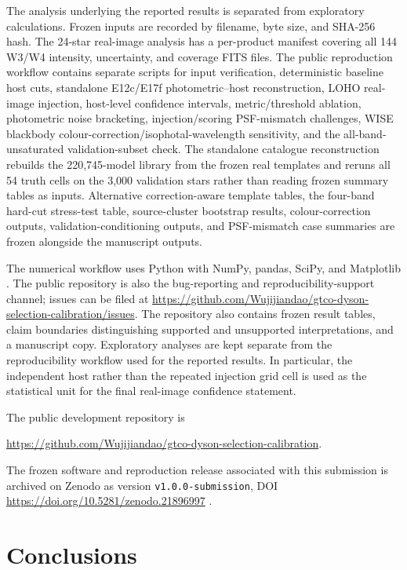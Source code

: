 \documentclass[fleqn,usenatbib]{mnras}
\begin{document}
The analysis underlying the reported results is separated from exploratory calculations. Frozen inputs are recorded by filename, byte size, and SHA-256 hash. The 24-star real-image analysis has a per-product manifest covering all 144 W3/W4 intensity, uncertainty, and coverage FITS files. The public reproduction workflow contains separate scripts for input verification, deterministic baseline host cuts, standalone E12c/E17f photometric--host reconstruction, LOHO real-image injection, host-level confidence intervals, metric/threshold ablation, photometric noise bracketing, injection/scoring PSF-mismatch challenges, WISE blackbody colour-correction/isophotal-wavelength sensitivity, and the all-band-unsaturated validation-subset check. The standalone catalogue reconstruction rebuilds the 220,745-model library from the frozen real templates and reruns all 54 truth cells on the 3,000 validation stars rather than reading frozen summary tables as inputs. Alternative correction-aware template tables, the four-band hard-cut stress-test table, source-cluster bootstrap results, colour-correction outputs, validation-conditioning outputs, and PSF-mismatch case summaries are frozen alongside the manuscript outputs.

The numerical workflow uses Python with NumPy, pandas, SciPy, and Matplotlib \citep{Harris2020,McKinney2010,Virtanen2020,Hunter2007}. The public repository is also the bug-reporting and reproducibility-support channel; issues can be filed at \url{https://github.com/Wujijiandao/gtco-dyson-selection-calibration/issues}. The repository also contains frozen result tables, claim boundaries distinguishing supported and unsupported interpretations, and a manuscript copy. Exploratory analyses are kept separate from the reproducibility workflow used for the reported results. In particular, the independent host rather than the repeated injection grid cell is used as the statistical unit for the final real-image confidence statement.

The public development repository is
\begin{center}
\url{https://github.com/Wujijiandao/gtco-dyson-selection-calibration}.
\end{center}
The frozen software and reproduction release associated with this submission is archived on Zenodo as version \texttt{v1.0.0-submission}, DOI \url{https://doi.org/10.5281/zenodo.21896997} \citep{Zhang2026GTCO}.

\section{Conclusions}
\end{document}
